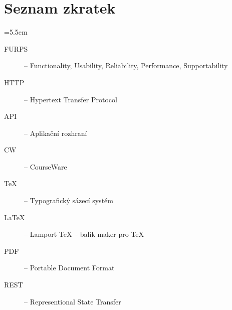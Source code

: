 \appendix

\chapter{Seznam zkratek}

\medskip
\bgroup \leftskip=5.5em

\begin{description}
	
	\item[FURPS] -- Functionality, Usability, Reliability, Performance, Supportability
	
	\item[HTTP] -- Hypertext Transfer Protocol
	
	\item[API] -- Aplikační rozhraní
	
	\item[CW] -- CourseWare
	
	\item[\TeX] -- Typografický sázecí systém
	
	\item[\LaTeX] -- Lamport \TeX\ - balík maker pro \TeX
	
	\item[PDF] -- Portable Document Format
	
	\item[REST] -- Representional State Transfer
	
	
	

\end{description}

\par\egroup